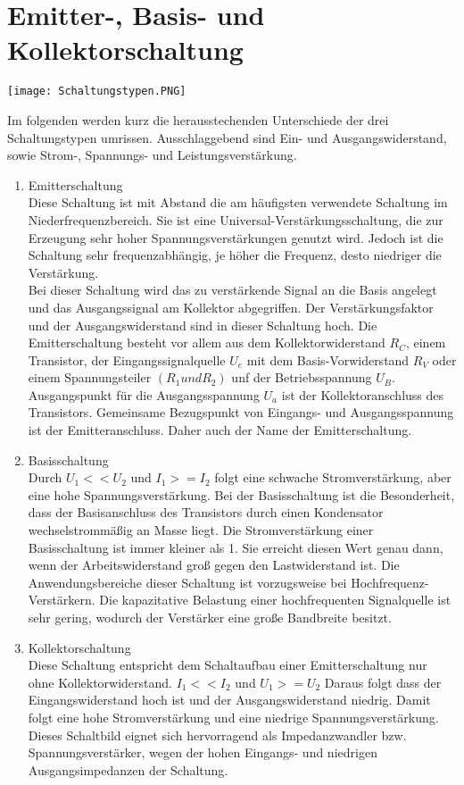 \section{Emitter-, Basis- und Kollektorschaltung}
\begin{center}
    \texttt{[image: Schaltungstypen.PNG]}
\end{center}
Im folgenden werden kurz die herausstechenden Unterschiede der drei Schaltungstypen
umrissen. Ausschlaggebend sind Ein- und Ausgangswiderstand, sowie Strom-, Spannungs- und
Leistungsverstärkung.
\begin{enumerate} 
\item Emitterschaltung\\
Diese Schaltung ist mit Abstand die am häufigsten verwendete Schaltung im
Niederfrequenzbereich. Sie ist eine Universal-Verstärkungsschaltung, die zur Erzeugung sehr hoher Spannungsverstärkungen genutzt wird. Jedoch ist die Schaltung sehr frequenzabhängig, je höher die Frequenz, desto niedriger die Verstärkung. \\
Bei dieser Schaltung wird das zu verstärkende Signal an die Basis angelegt
und das Ausgangssignal am Kollektor abgegriffen. Der Verstärkungsfaktor und der
Ausgangswiderstand sind in dieser Schaltung hoch. Die Emitterschaltung besteht vor allem aus dem Kollektorwiderstand $R_C$, einem Transistor, der Eingangssignalquelle $U_e$ mit dem Basis-Vorwiderstand $R_V$ oder einem Spannungsteiler $(R_1 und R_2)$ unf der Betriebsspannung $U_B$. Ausgangspunkt für die Ausgangsspannung $U_a$ ist der Kollektoranschluss des Transistors. Gemeinsame Bezugspunkt von Eingangs- und Ausgangsspannung ist der Emitteranschluss. Daher auch der Name der Emitterschaltung. 
\item Basisschaltung\\
Durch $U_1<<U_2$ und $I_1>=I_2$ folgt eine schwache Stromverstärkung, aber eine hohe
Spannungsverstärkung. Bei der Basisschaltung ist die Besonderheit, dass der Basisanschluss des Transistors durch einen Kondensator wechselstrommäßig an Masse liegt. Die Stromverstärkung einer Basisschaltung ist immer kleiner als 1. Sie erreicht diesen Wert genau dann, wenn der Arbeitswiderstand groß gegen den Lastwiderstand ist.  
Die Anwendungsbereiche dieser Schaltung ist vorzugsweise bei Hochfrequenz-Verstärkern. Die kapazitative Belastung einer hochfrequenten Signalquelle ist sehr gering, wodurch der Verstärker eine große Bandbreite besitzt. 
\item Kollektorschaltung\\
Diese Schaltung entspricht dem Schaltaufbau einer Emitterschaltung nur ohne Kollektorwiderstand. 
$I_1<<I_2$ und $U_1>=U_2$ Daraus folgt dass der Eingangswiderstand hoch ist und der
Ausgangswiderstand niedrig. Damit folgt eine hohe Stromverstärkung und eine niedrige
Spannungsverstärkung.
Dieses Schaltbild eignet sich hervorragend als Impedanzwandler bzw. Spannungsverstärker, wegen der hohen Eingangs- und niedrigen Ausgangsimpedanzen der Schaltung. 
\end{enumerate}
